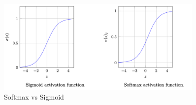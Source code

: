 \begin{enumerate}
    \begin{figure}[h!]
        \centering
        \includegraphics[width=0.9\textwidth]{img/softmax.png}
        \caption{Softmax vs Sigmoid}
        \label{fig:softmax-graph}
    \end{figure}
 
\end{enumerate}


